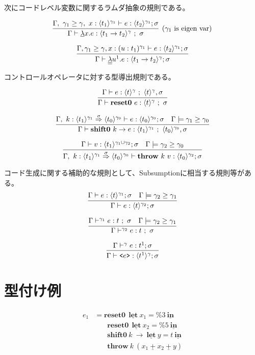 \documentclass[T]{compsoft}
\newcommand\Resetz{\textbf{reset0}}
\newcommand\Shiftz{\textbf{shift0}}
\newcommand\Throw{\textbf{throw}}
\newcommand\resetz[1]{\Resetz~{#1}}
\newcommand\shiftz[2]{\Shiftz~{#1}\to{#2}}
\newcommand\throw[2]{\Throw~{#1}~{#2}}
\newcommand\cfun[2]{\underline{\lambda}{#1}.{#2}}
\newcommand\ccfun[2]{\underline{\underline{\lambda}}{#1}.{#2}}
\newcommand\cPlus{\underline{\textbf{+}}}
\newcommand\cLet{\underline{\textbf{let}}}
\newcommand\cIn{\underline{\textbf{in}}}
\newcommand\csp[1]{\texttt{\%}{#1}}
\newcommand\code[1]{\texttt{<}{#1}\texttt{>}}
\newcommand\codeT[2]{\langle{#1}\rangle^{#2}}
\newcommand\contT[3]{{#1} \stackrel{#3}{\Rightarrow} {#2}}
\newcommand\ord{\ge}
\theoremstyle{break}
\begin{document}
次にコードレベル変数に関するラムダ抽象の規則である。

\[
  \infer[(\gamma_1~\text{is eigen var})]
  {\Gamma \vdash \cfun{x}{e} : \codeT{t_1\to t_2}{\gamma} ~;~ \sigma}
  {\Gamma,~\gamma_1 \ord \gamma,~x:\codeT{t_1}{\gamma_1} \vdash e
    : \codeT{t_2}{\gamma_1}; \sigma}
\]

\[
  \infer
  {\Gamma \vdash \ccfun{u^1}{e} : \codeT{t_1 \to t_2}{\gamma} ; \sigma}
  {\Gamma, \gamma_1 \ord \gamma, x : (u : t_1)^{\gamma_1} \vdash e : \codeT{t_2}{\gamma_1} ; \sigma}
\]

コントロールオペレータに対する型導出規則である。

\[
  \infer{\Gamma \vdash \resetz{e} : \codeT{t}{\gamma} ~;~ \sigma}
  {\Gamma \vdash e : \codeT{t}{\gamma} ~;~ \codeT{t}{\gamma}, \sigma}
\]

\[
  \infer{\Gamma \vdash \shiftz{k}{e} : \codeT{t_1}{\gamma_1} ~;~ \codeT{t_0}{\gamma_0},\sigma}
  {\Gamma,~k:\contT{\codeT{t_1}{\gamma_1}}{\codeT{t_0}{\gamma_0}}{\sigma}
    \vdash e : \codeT{t_0}{\gamma_0} ; \sigma
    & \Gamma \models \gamma_1 \ord \gamma_0
  }
\]

\[
  \infer
  {\Gamma,~k:\contT{\codeT{t_1}{\gamma_1}}{\codeT{t_0}{\gamma_0}}{\sigma}
    \vdash \throw{k}{v} : \codeT{t_0}{\gamma_2} ; \sigma}
  {\Gamma
    \vdash v : \codeT{t_1}{\gamma_1 \cup \gamma_2} ; \sigma
    & \Gamma \models \gamma_2 \ord \gamma_0
  }
\]

コード生成に関する補助的な規則として、Subsumptionに相当する規則等がある。
\[
  \infer
  {\Gamma \vdash e : \codeT{t}{\gamma_2} ; \sigma}
  {\Gamma \vdash e : \codeT{t}{\gamma_1} ; \sigma
    & \Gamma \models \gamma_2 \ord \gamma_1
  }
\]

\[
  \infer
  {\Gamma \vdash^{\gamma_2} e : t ~;~ \sigma}
  {\Gamma \vdash^{\gamma_1} e : t ~;~ \sigma
    & \Gamma \models \gamma_2 \ord \gamma_1
  }
\]


\[
  \infer
  {\Gamma \vdash \code{e} : \codeT{t^1}{\gamma} ; \sigma}
  {\Gamma \vdash^{\gamma} e : t^1 ; \sigma}
\]


\section{型付け例}

\begin{align*}
  e_1 & = \Resetz ~~\cLet~x_1=\csp{3}~\cIn \\
      & \phantom{=}~~ \Resetz ~~\cLet~x_2=\csp{5}~\cIn \\
      & \phantom{=}~~ \Shiftz~k~\to~\cLet~y=t~\cIn \\
      & \phantom{=}~~ \Throw~k~(x_1~\cPlus~x_2~\cPlus~y)
\end{align*}
\end{document}
